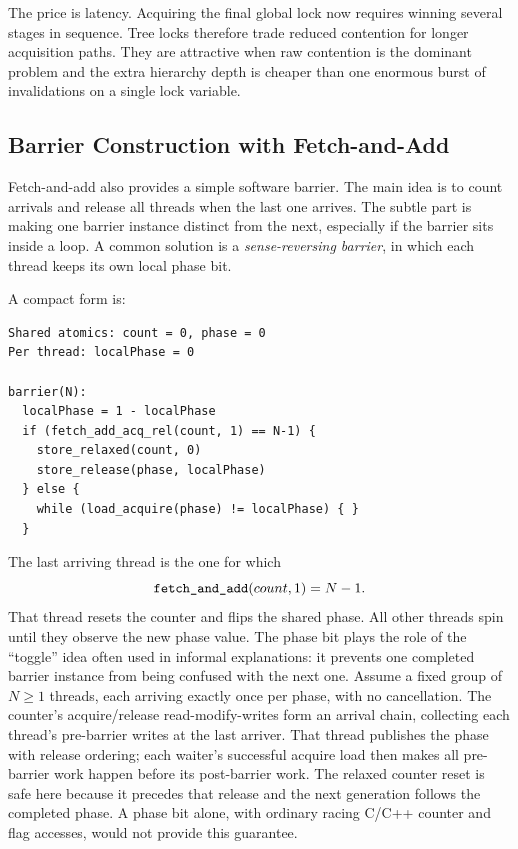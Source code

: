 The price is latency.
Acquiring the final global lock now requires winning several stages in sequence.
Tree locks therefore trade reduced contention for longer acquisition paths.
They are attractive when raw contention is the dominant problem and the extra hierarchy depth is cheaper than one enormous burst of invalidations on a single lock variable.

\subsection*{Barrier Construction with Fetch-and-Add}
Fetch-and-add also provides a simple software barrier.
The main idea is to count arrivals and release all threads when the last one arrives.
The subtle part is making one barrier instance distinct from the next, especially if the barrier sits inside a loop.
A common solution is a \textit{sense-reversing barrier}, in which each thread keeps its own local phase bit.

A compact form is:
\begin{verbatim}
Shared atomics: count = 0, phase = 0
Per thread: localPhase = 0

barrier(N):
  localPhase = 1 - localPhase
  if (fetch_add_acq_rel(count, 1) == N-1) {
    store_relaxed(count, 0)
    store_release(phase, localPhase)
  } else {
    while (load_acquire(phase) != localPhase) { }
  }
\end{verbatim}
The last arriving thread is the one for which
\begin{equation}\label{eq:ch9-formula-barrier-last}
    \text{\texttt{fetch\_and\_add}}(count,1)=N-1.
\end{equation}
That thread resets the counter and flips the shared phase.
All other threads spin until they observe the new phase value.
The phase bit plays the role of the ``toggle'' idea often used in informal explanations: it prevents one completed barrier instance from being confused with the next one.
Assume a fixed group of $N\ge1$ threads, each arriving exactly once per phase, with no cancellation.
The counter's acquire/release read-modify-writes form an arrival chain, collecting each thread's pre-barrier writes at the last arriver.
That thread publishes the phase with release ordering; each waiter's successful acquire load then makes all pre-barrier work happen before its post-barrier work.
The relaxed counter reset is safe here because it precedes that release and the next generation follows the completed phase.
A phase bit alone, with ordinary racing C/C++ counter and flag accesses, would not provide this guarantee.

